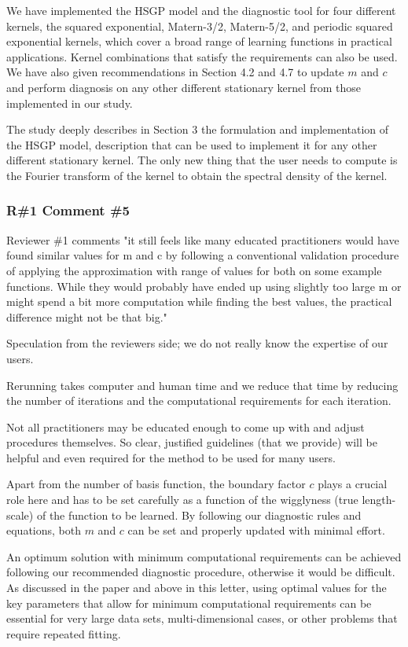 \documentclass[11pt]{report}
\begin{document}
We have implemented the HSGP model and the diagnostic tool for four different kernels, the squared exponential, Matern-3/2, Matern-5/2, and periodic squared exponential kernels, which cover a broad range of learning functions in practical applications. Kernel combinations that satisfy the requirements can also be used. We have also given recommendations in Section 4.2 and 4.7 to update $m$ and $c$ and perform diagnosis on any other different stationary kernel from those implemented in our study.

The study deeply describes in Section 3 the formulation and implementation of the HSGP model, description that can be used to implement it for any other different stationary kernel. The only new thing that the user needs to compute is the Fourier transform of the kernel to obtain the spectral density of the kernel.

\subsubsection*{R\#1 Comment \#5}

Reviewer \#1 comments "it still feels like many educated practitioners would have found similar values for m and c by following a conventional validation procedure of applying the approximation with range of values for both on some example functions. While they would probably have ended up using slightly too large m or might spend a bit more computation while finding the best values, the practical difference might not be that big."

Speculation from the reviewers side; we do not really know the expertise of our users. 

Rerunning takes computer and human time and we reduce that time by reducing the number of iterations and the computational requirements for each iteration. 

Not all practitioners may be educated enough to come up with and adjust procedures themselves. So clear, justified guidelines (that we provide) will be helpful and even required for the method to be used for many users.

Apart from the number of basis function, the boundary factor $c$ plays a crucial role here and has to be set carefully as a function of the wigglyness (true length-scale) of the function to be learned. By following our diagnostic rules and equations, both $m$ and $c$ can be set and properly updated with minimal effort.

An optimum solution with minimum computational requirements can be achieved following our recommended diagnostic procedure, otherwise it would be difficult. As discussed in the paper and above in this letter, using optimal values for the key parameters that allow for minimum computational requirements can be essential for very large data sets, multi-dimensional cases, or other problems that require repeated fitting.
\end{document}

